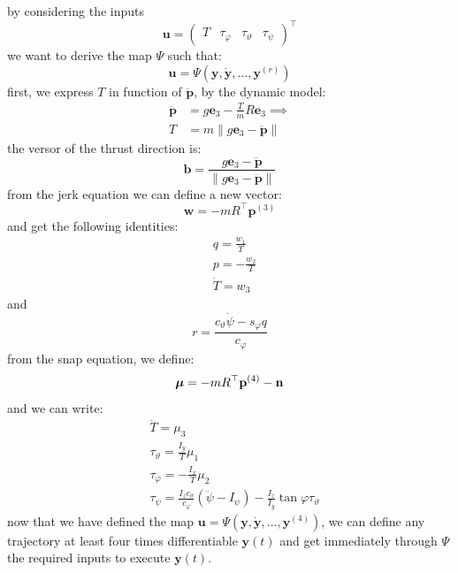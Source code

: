 \documentclass[10pt, a4paper]{report}
\begin{document}
by considering the inputs\begin{equation}
    \mathbf u=\begin{pmatrix}
        T&\tau_\varphi&\tau_\vartheta&\tau_\psi
    \end{pmatrix}^\top
\end{equation}
we want to derive the map $\Psi$ such that:\begin{equation}
    \mathbf u = \Psi(\mathbf y,\dot{\mathbf y},\dots, \mathbf y^{(r)})
\end{equation}
first, we express $T$ in function of $\ddot{\mathbf p}$, by the dynamic model:\begin{align}
    \ddot{\mathbf p}&=g\mathbf e_3-\frac{T}{m}R\mathbf e_3\implies \\
    T&=m\|g\mathbf e_3-\ddot{\mathbf p}\|
\end{align}
the versor of the thrust direction is:\begin{equation}
    \mathbf b = \frac{g\mathbf e_3-\ddot{\mathbf p}}{\|g\mathbf e_3-\ddot{\mathbf p}\|}
\end{equation}
from the jerk equation we can define a new vector:\begin{equation}
    \mathbf w = -mR^\top\mathbf p^{(3)}
\end{equation}
and get the following identities:\begin{align}
    &q=\frac{w_1}{T}\\ 
    &p=-\frac{w_2}{T}\\ 
    &\dot T = w_3
\end{align}
and\begin{equation}
    r=\frac{c_\vartheta\dot\psi-s_\varphi q}{c_\varphi}
\end{equation}
from the snap equation, we define:\begin{equation}
    {\boldsymbol{\mu}}=-mR^\top\mathbf p^{(4)}-\mathbf n
\end{equation}
and we can write:\begin{align}
    &\ddot T = \mu_3\\ 
    &\tau_\vartheta=\frac{I_y}{T}\mu_1\\ 
    &\tau_\varphi = -\frac{I_x}{T}\mu_2\\ 
    &\tau_\psi=\frac{I_zc_\vartheta}{c_\varphi}(\ddot\psi-I_\psi)-\frac{I_z}{I_y}\tan\varphi\tau_\vartheta
\end{align}
now that we have defined the map $\mathbf u=\Psi(\mathbf y,\dot{\mathbf y},\dots, \mathbf y^{(4)})$, we can define any trajectory at least four times differentiable $\mathbf y(t)$ and get immediately through $\Psi$ the required inputs to execute $\mathbf y(t)$.
\end{document}
